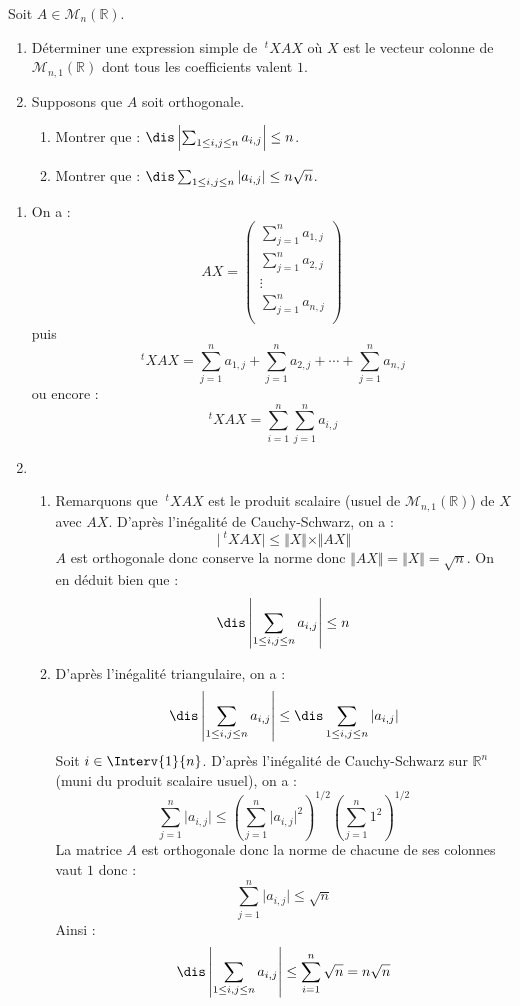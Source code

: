 \documentclass[a4paper,10pt]{report}
\begin{document}
\begin{Exa} Soit $A \in \mathcal{M}_n(\mathbb{R})$.

\begin{enumerate}
\item Déterminer une expression simple de $~^tX A X$ où $X$ est le vecteur colonne de $\mathcal{M}_{n,1}(\mathbb{R})$ dont tous les coefficients valent $1$.  
\item Supposons que $A$ soit orthogonale.
\begin{enumerate}
\item Montrer que : $\dis \left\vert \sum_{1 \leq i,j \leq n} a_{i,j} \right\vert \leq n$.
\item Montrer que : $\dis  \sum_{1 \leq i,j \leq n} \vert a_{i,j} \vert  \leq n \sqrt{n}$.
\end{enumerate}
\end{enumerate}
\end{Exa}

\corr

\begin{enumerate}
\item On a :
$$ AX = \begin{pmatrix}
\sum_{j=1}^n a_{1,j} \\
\sum_{j=1}^n a_{2,j} \\ 
\vdots \\
\sum_{j=1}^n a_{n,j} \\
\end{pmatrix}$$
puis 
$$ ~^tX A X =\sum_{j=1}^n a_{1,j} + \sum_{j=1}^n a_{2,j} + \cdots + \sum_{j=1}^n a_{n,j}$$
ou encore :
$$  ~^tX A X = \sum_{i=1}^n \sum_{j=1}^n a_{i,j}$$
\item
\begin{enumerate}
\item Remarquons que $~^tX A X$ est le produit scalaire (usuel de $\mathcal{M}_{n,1}(\mathbb{R})$) de $X$ avec $AX$. D'après l'inégalité de Cauchy-Schwarz, on a :
$$ \vert ~^tX A X \vert \leq \Vert X \Vert \times \Vert AX \Vert$$
$A$ est orthogonale donc conserve la norme donc $\Vert AX \Vert = \Vert X \Vert = \sqrt{n}$. On en déduit bien que :
$$ \dis \left\vert \sum_{1 \leq i,j \leq n} a_{i,j} \right\vert \leq n$$
\item D'après l'inégalité triangulaire, on a :
$$ \dis \left\vert \sum_{1 \leq i,j \leq n} a_{i,j} \right\vert \leq \dis  \sum_{1 \leq i,j \leq n} \vert a_{i,j}  \vert$$
Soit $i \in \Interv{1}{n}$. D'après l'inégalité de Cauchy-Schwarz sur $\mathbb{R}^n$ (muni du produit scalaire usuel), on a :
$$ \sum_{j=1}^n \vert a_{i,j}  \vert \leq \left(\sum_{j=1}^n \vert a_{i,j}  \vert^2 \right)^{1/2}  \left(\sum_{j=1}^n 1^2 \right)^{1/2}$$
La matrice $A$ est orthogonale donc la norme de chacune de ses colonnes vaut $1$ donc :
$$  \sum_{j=1}^n \vert a_{i,j}  \vert \leq  \sqrt{n}$$
Ainsi :
$$ \dis \left\vert \sum_{1 \leq i,j \leq n} a_{i,j} \right\vert \leq \sum_{i=1}^n \sqrt{n} = n \sqrt{n}$$
\end{enumerate}
\end{enumerate}
\end{document}
